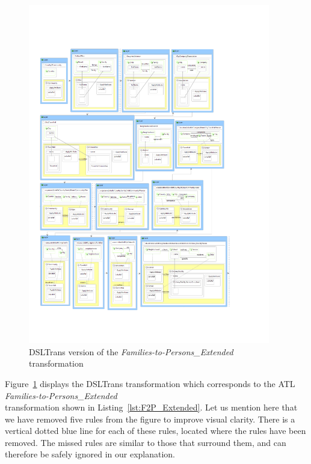 \begin{figure}
  \begin{center}
  \includegraphics[width=0.94\textwidth]{figures/DSLTrans/DSLTrans_Rules_javi.pdf}
  \caption{DSLTrans version of the \emph{Families-to-Persons\_Extended} transformation}
  \label{fig:DSLTrans_rules}
  \end{center}
\end{figure}


Figure~\ref{fig:DSLTrans_rules} displays the DSLTrans transformation which corresponds to the ATL \emph{Families-to-Persons\_Extended}\\
transformation shown in Listing~\ref{lst:F2P_Extended}. Let us mention here that we have removed five rules from the figure to improve visual clarity.
There is a vertical dotted blue line for each of these rules, located where the rules have been removed. The missed rules are similar to those that surround them, and can therefore be safely ignored in our explanation.


